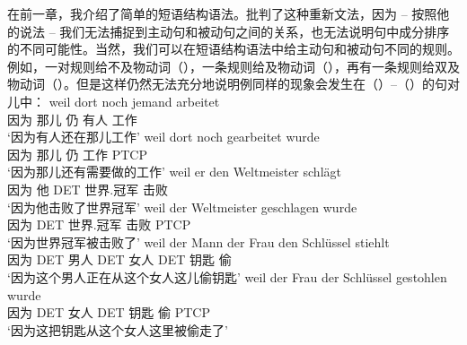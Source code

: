 在前一章，我介绍了简单的短语结构语法。\citet[Chapter~5]{Chomsky57a}批判了这种重新文法，因为 -- 按照他的说法 -- 我们无法捕捉到主动句和被动句之间的关系，也无法说明句中成分排序的不同可能性。当然，我们可以在短语结构语法中给主动句和被动句不同的规则。例如，一对规则给不及物动词（），一条规则给及物动词（），再有一条规则给双及物动词（）。但是这样仍然无法充分地说明例同样的现象会发生在（）--（）的句对儿中：
\eal
\label{ex-transformations-intr}
\ex 
\gll weil dort noch jemand arbeitet\\
     因为 那儿 仍 有人 工作\\
\glt `因为有人还在那儿工作'
\ex 
\gll weil dort noch gearbeitet wurde\\
     因为 那儿 仍 工作 PTCP\\
\glt `因为那儿还有需要做的工作'	 
\zl
\eal
\ex 
\gll weil er den Weltmeister schlägt\\
	 因为 他 DET 世界.冠军 击败\\
\glt `因为他击败了世界冠军'
\ex 
\gll weil der Weltmeister geschlagen wurde\\
	 因为 DET 世界.冠军 击败 PTCP\\
\glt `因为世界冠军被击败了'
\zl
\eal
\label{ex-transformations-ditr}
\ex 
\gll weil der Mann der Frau den Schlüssel stiehlt\\
	 因为 DET 男人 DET 女人 DET 钥匙 偷\\
\glt `因为这个男人正在从这个女人这儿偷钥匙'
\ex 
\gll weil der Frau der Schlüssel gestohlen wurde\\
	 因为 DET 女人 DET 钥匙 偷 PTCP\\
\glt `因为这把钥匙从这个女人这里被偷走了'
\zl

